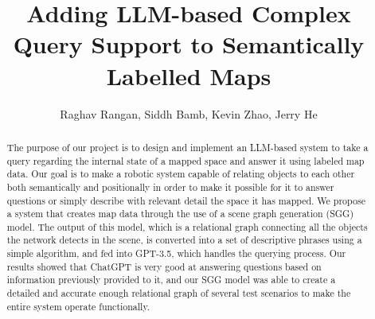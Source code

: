 \documentclass[letterpaper, 10 pt, conference]{ieeeconf}  %
\title{\LARGE \bf
Adding LLM-based Complex Query Support to Semantically Labelled Maps}
\author{Raghav Rangan, Siddh Bamb, Kevin Zhao, Jerry He%
}
\begin{document}
\maketitle
\thispagestyle{empty}
\pagestyle{empty}


\begin{abstract}
    The purpose of our project is to design and implement an LLM-based system to take a query regarding the internal state of a mapped space and answer it using labeled map data. Our goal is to make a robotic system capable of relating objects to each other both semantically and positionally in order to make it possible for it to answer questions or simply describe with relevant detail the space it has mapped. We propose a system that creates map data through the use of a scene graph generation (SGG) model. The output of this model, which is a relational graph connecting all the objects the network detects in the scene, is converted into a set of descriptive phrases using a simple algorithm, and fed into GPT-3.5, which handles the querying process. Our results showed that ChatGPT is very good at answering questions based on information previously provided to it, and our SGG model was able to create a detailed and accurate enough relational graph of several test scenarios to make the entire system operate functionally.
\end{abstract}
    
\end{document}

